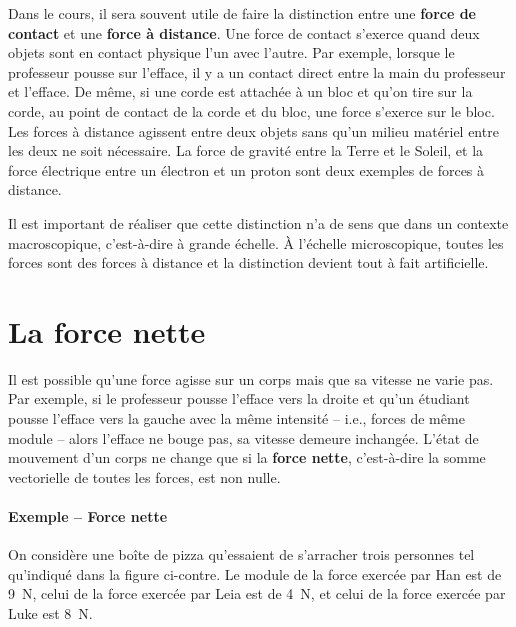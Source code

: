 Dans le cours, il sera souvent utile de faire la distinction entre une
\textbf{force de contact} et une \textbf{force à distance}.  Une force de
contact s'exerce quand deux objets sont en contact physique l'un avec l'autre.
Par exemple, lorsque le professeur pousse sur l'efface, il y a un contact
direct entre la main du professeur et l'efface.  De même, si une corde est
attachée à un bloc et qu'on tire sur la corde, au point de contact de la corde
et du bloc, une force s'exerce sur le bloc.  Les forces à distance agissent
entre deux objets sans qu'un milieu matériel entre les deux ne soit nécessaire.
La force de gravité entre la Terre et le Soleil, et la force électrique entre
un électron et un proton sont deux exemples de forces à distance.

Il est important de réaliser que cette distinction n'a de sens que dans un
contexte macroscopique, c'est-à-dire à grande échelle.  À l'échelle
microscopique, toutes les forces sont des forces à distance et la distinction
devient tout à fait artificielle.


\section{La force nette}

Il est possible qu'une force agisse sur un corps mais que sa vitesse ne varie
pas.  Par exemple, si le professeur pousse l'efface vers la droite et qu'un
étudiant pousse l'efface vers la gauche avec la même intensité -- i.e., forces
de même module -- alors l'efface ne bouge pas, sa vitesse demeure inchangée.
L'état de mouvement d'un corps ne change que si la \textbf{force
nette}, c'est-à-dire la somme vectorielle de toutes les forces, est non nulle.

\paragraph{Exemple -- Force nette}

On considère une boîte de pizza qu'essaient de s'arracher trois personnes tel
qu'indiqué dans la figure ci-contre.  Le module de la force exercée par Han est
de \SI{9}{\newton}, celui de la force exercée par Leia est de \SI{4}{\newton},
et celui de la force exercée par Luke est \SI{8}{\newton}.

